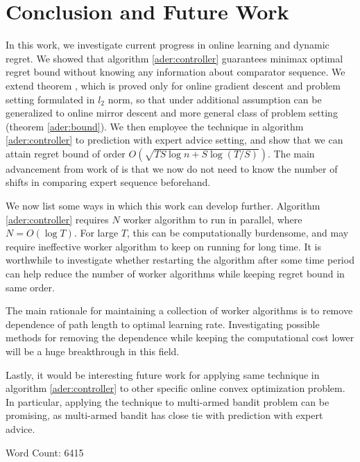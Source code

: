 \documentclass[12pt, a4paper]{report}
\begin{document}
\chapter{Conclusion and Future Work}
\label{Chap4}
In this work, we investigate current progress in online learning and dynamic regret. We showed that algorithm \ref{ader:controller} guarantees minimax optimal regret bound without knowing any information about comparator sequence. We extend theorem \cite[Theorem 3]{Zhang2018AdaptiveOL}, which is proved only for online gradient descent and problem setting formulated in $l_2$ norm, so that under additional assumption can be generalized to online mirror descent and more general class of problem setting (theorem \ref{ader:bound}). We then employee the technique in algorithm \ref{ader:controller} to prediction with expert advice setting, and show that we can attain regret bound of order $O(\sqrt{TS\log n +S\log(T/S)})$. The main advancement from work of \cite{Herbster1995TrackingTB} is that we now do not need to know the number of shifts in comparing expert sequence beforehand.

We now list some ways in which this work can develop further. Algorithm \ref{ader:controller} requires $N$ worker algorithm to run in parallel, where $N = O(\log T)$. For large $T$, this can be computationally burdensome, and may require ineffective worker algorithm to keep on running for long time. It is worthwhile to investigate whether restarting the algorithm after some time period can help reduce the number of worker algorithms while keeping regret bound in same order. 

The main rationale for maintaining a collection of worker algorithms is to remove dependence of path length to optimal learning rate. Investigating possible methods for removing the dependence while keeping the computational cost lower will be a huge breakthrough in this field. 

Lastly, it would be interesting future work for applying same technique in algorithm \ref{ader:controller} to other specific online convex optimization problem. In particular, applying the technique to multi-armed bandit problem can be promising, as multi-armed bandit has close tie with prediction with expert advice. 

\small{Word Count: 6415}

\renewcommand{\bibname}{Bibliography}


\end{document}
